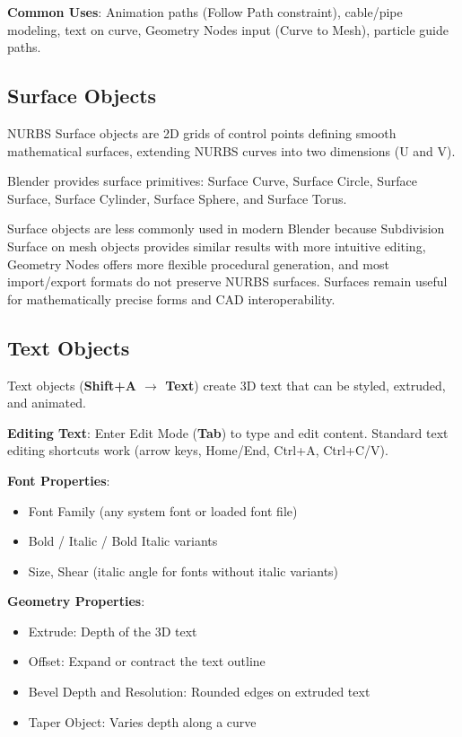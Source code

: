\textbf{Common Uses}: Animation paths (Follow Path constraint), cable/pipe modeling, text on curve, Geometry Nodes input (Curve to Mesh), particle guide paths.

\subsection{Surface Objects}
\label{sec:surfaces}

NURBS Surface objects are 2D grids of control points defining smooth mathematical surfaces, extending NURBS curves into two dimensions (U and V).

Blender provides surface primitives: Surface Curve, Surface Circle, Surface Surface, Surface Cylinder, Surface Sphere, and Surface Torus.

Surface objects are less commonly used in modern Blender because Subdivision Surface on mesh objects provides similar results with more intuitive editing, Geometry Nodes offers more flexible procedural generation, and most import/export formats do not preserve NURBS surfaces. Surfaces remain useful for mathematically precise forms and CAD interoperability.

\subsection{Text Objects}
\label{sec:text}

Text objects (\textbf{Shift+A $\rightarrow$ Text}) create 3D text that can be styled, extruded, and animated.

\textbf{Editing Text}: Enter Edit Mode (\textbf{Tab}) to type and edit content. Standard text editing shortcuts work (arrow keys, Home/End, Ctrl+A, Ctrl+C/V).

\textbf{Font Properties}:
\begin{itemize}[leftmargin=2em]
  \item Font Family (any system font or loaded font file)
  \item Bold / Italic / Bold Italic variants
  \item Size, Shear (italic angle for fonts without italic variants)
\end{itemize}

\textbf{Geometry Properties}:
\begin{itemize}[leftmargin=2em]
  \item Extrude: Depth of the 3D text
  \item Offset: Expand or contract the text outline
  \item Bevel Depth and Resolution: Rounded edges on extruded text
  \item Taper Object: Varies depth along a curve
\end{itemize}


